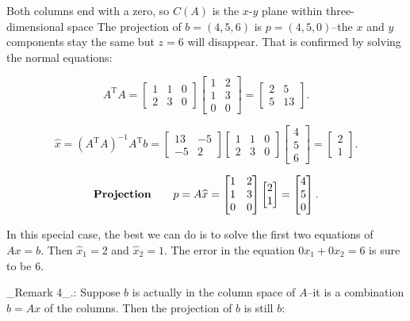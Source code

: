 Both columns end with a zero, so \(C(A)\) is the \(x\)-\(y\) plane within three-dimensional space The projection of \(b=(4,5,6)\) is \(p=(4,5,0)\)--the \(x\) and \(y\) components stay the same but \(z=6\) will disappear. That is confirmed by solving the normal equations:

\[A^{\mathrm{T}}A=\begin{bmatrix}1&1&0\\ 2&3&0\end{bmatrix}\begin{bmatrix}1&2\\ 1&3\\ 0&0\end{bmatrix}=\begin{bmatrix}2&5\\ 5&13\end{bmatrix}.\]

\[\widehat{x}=(A^{\mathrm{T}}A)^{-1}A^{\mathrm{T}}b=\begin{bmatrix}13&-5\\ -5&2\end{bmatrix}\begin{bmatrix}1&1&0\\ 2&3&0\end{bmatrix}\begin{bmatrix}4\\ 5\\ 6\end{bmatrix}=\begin{bmatrix}2\\ 1\end{bmatrix}.\]

\[\text{\bf Projection}\qquad p=A\widehat{x}=\begin{bmatrix}1&2\\ 1&3\\ 0&0\end{bmatrix}\begin{bmatrix}2\\ 1\end{bmatrix}=\begin{bmatrix}4\\ 5\\ 0\end{bmatrix}.\]

In this special case, the best we can do is to solve the first two equations of \(Ax=b\). Then \(\widehat{x}_{1}=2\) and \(\widehat{x}_{2}=1\). The error in the equation \(0x_{1}+0x_{2}=6\) is sure to be \(6\).

_Remark 4_.: Suppose \(b\) is actually in the column space of \(A\)--it is a combination \(b=Ax\) of the columns. Then the projection of \(b\) is still \(b\):


